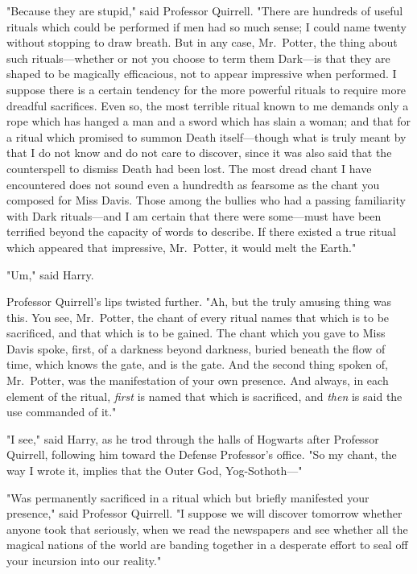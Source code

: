 "Because they are stupid," said Professor Quirrell. "There are hundreds of
useful rituals which could be performed if men had so much sense; I could name
twenty without stopping to draw breath. But in any case, Mr.~Potter, the thing
about such rituals—whether or not you choose to term them Dark—is that they
are shaped to be magically efficacious, not to appear impressive when
performed. I suppose there is a certain tendency for the more powerful rituals
to require more dreadful sacrifices. Even so, the most terrible ritual known to
me demands only a rope which has hanged a man and a sword which has slain a
woman; and that for a ritual which promised to summon Death itself—though
what is truly meant by that I do not know and do not care to discover, since it
was also said that the counterspell to dismiss Death had been lost. The most
dread chant I have encountered does not sound even a hundredth as fearsome as
the chant you composed for Miss Davis. Those among the bullies who had a
passing familiarity with Dark rituals—and I am certain that there were
some—must have been terrified beyond the capacity of words to describe. If
there existed a true ritual which appeared that impressive, Mr.~Potter, it
would melt the Earth."

"Um," said Harry.

Professor Quirrell's lips twisted further. "Ah, but the truly amusing thing was
this. You see, Mr.~Potter, the chant of every ritual names that which is to be
sacrificed, and that which is to be gained. The chant which you gave to Miss
Davis spoke, first, of a darkness beyond darkness, buried beneath the flow of
time, which knows the gate, and is the gate. And the second thing spoken of,
Mr.~Potter, was the manifestation of your own presence. And always, in each
element of the ritual, \emph{first} is named that which is sacrificed, and
\emph{then} is said the use commanded of it."

"I{\el} see," said Harry, as he trod through the halls of Hogwarts after
Professor Quirrell, following him toward the Defense Professor's office. "So my
chant, the way I wrote it, implies that the Outer God, Yog-Sothoth—"

"Was permanently sacrificed in a ritual which but briefly manifested your
presence," said Professor Quirrell. "I suppose we will discover tomorrow
whether anyone took that seriously, when we read the newspapers and see whether
all the magical nations of the world are banding together in a desperate effort
to seal off your incursion into our reality."

